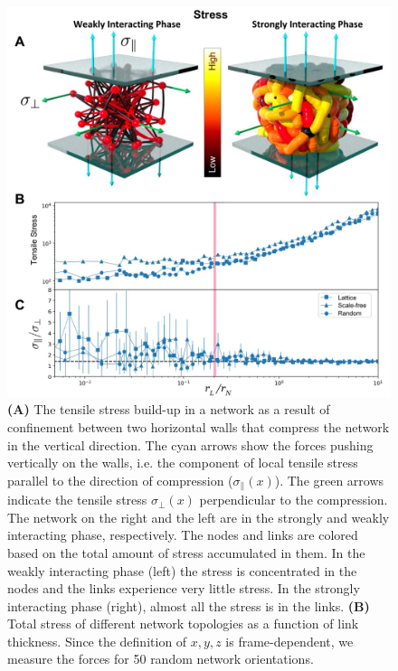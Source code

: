 \documentclass[nofootinbib,preprint,floatfix,titlepage,superscriptaddress]{revtex4} %
\begin{document}
\begin{figure}
    \vspace{5cm}
    \includegraphics[width=.9\columnwidth]{fig-09-19/3D-stress-110317.pdf}
    \caption{\scriptsize
    {\bf (A)} The tensile stress build-up in a network as a result of confinement between two horizontal walls that
    compress the network in the vertical direction.
    The cyan arrows show the forces pushing vertically on the walls, i.e. the component of local tensile stress parallel to the direction of compression ($\sigma_\parallel(x)$). 
    The green arrows indicate the tensile stress $\sigma_\perp(x)$
    perpendicular to the compression. 
    The network on the right and the left are in the strongly and weakly interacting phase, respectively. 
    The nodes and links are colored based on the total amount of stress accumulated in them. 
    In the weakly interacting phase (left) the stress is concentrated in the nodes and the links experience very little stress. 
    In the strongly interacting phase (right), almost all the stress is in the links.  
    {\bf (B)} Total stress of different network topologies as a function of link thickness. Since the definition of $x,y,z$ is frame-dependent, we measure the forces for 50 random network orientations. 
}
\end{figure}
\end{document}
